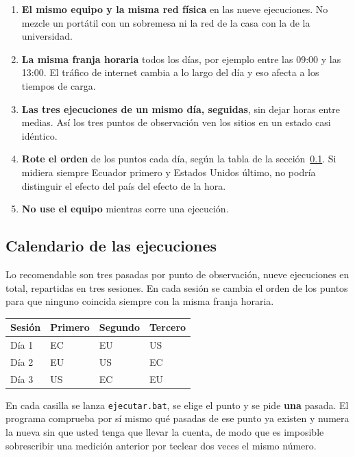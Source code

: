 \documentclass[11pt,a4paper]{article}
\begin{document}
\begin{enumerate}
	\item \textbf{El mismo equipo y la misma red física} en las nueve ejecuciones. No mezcle un portátil con un sobremesa ni la red de la casa con la de la universidad.
	\item \textbf{La misma franja horaria} todos los días, por ejemplo entre las 09:00 y las 13:00. El tráfico de internet cambia a lo largo del día y eso afecta a los tiempos de carga.
	\item \textbf{Las tres ejecuciones de un mismo día, seguidas}, sin dejar horas entre medias. Así los tres puntos de observación ven los sitios en un estado casi idéntico.
	\item \textbf{Rote el orden} de los puntos cada día, según la tabla de la sección~\ref{sec:calendario}. Si midiera siempre Ecuador primero y Estados Unidos último, no podría distinguir el efecto del país del efecto de la hora.
	\item \textbf{No use el equipo} mientras corre una ejecución.
\end{enumerate}

\subsection{Calendario de las ejecuciones}\label{sec:calendario}

Lo recomendable son tres pasadas por punto de observación, nueve ejecuciones en total, repartidas en tres sesiones. En cada sesión se cambia el orden de los puntos para que ninguno coincida siempre con la misma franja horaria.

\begin{center}
	\begin{tabular}{@{}l l l l@{}}
		\toprule
		\textbf{Sesión} & \textbf{Primero} & \textbf{Segundo} & \textbf{Tercero} \\
		\midrule
		Día 1 & EC & EU & US \\
		Día 2 & EU & US & EC \\
		Día 3 & US & EC & EU \\
		\bottomrule
	\end{tabular}
\end{center}

En cada casilla se lanza \texttt{ejecutar.bat}, se elige el punto y se pide \textbf{una} pasada. El programa comprueba por sí mismo qué pasadas de ese punto ya existen y numera la nueva sin que usted tenga que llevar la cuenta, de modo que es imposible sobrescribir una medición anterior por teclear dos veces el mismo número.
\end{document}
